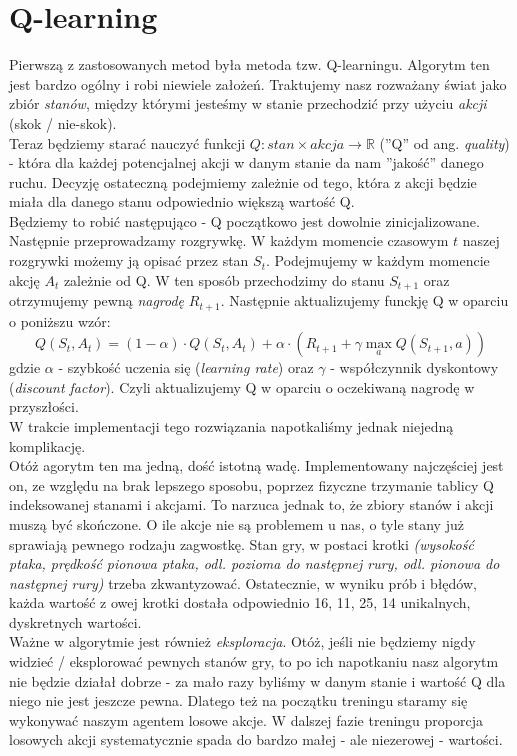\documentclass[12pt, A4]{article}
\begin{document}
\section{Q-learning}
Pierwszą z zastosowanych metod była metoda tzw. Q-learningu. Algorytm ten jest bardzo ogólny i robi niewiele założeń. Traktujemy nasz rozważany świat jako zbiór \textit{stanów}, między którymi jesteśmy w stanie przechodzić przy użyciu \textit{akcji} (skok / nie-skok).  \\
	Teraz będziemy starać nauczyć funkcji $Q: stan \times akcja \rightarrow \mathbb{R}$ (''Q'' od ang. \textit{quality}) - która dla każdej potencjalnej akcji w danym stanie da nam ''jakość'' danego ruchu. Decyzję ostateczną podejmiemy zależnie od tego, która z akcji będzie miała dla danego stanu odpowiednio większą wartość Q. \\	
	Będziemy to robić następująco - Q początkowo jest dowolnie zinicjalizowane. Następnie przeprowadzamy rozgrywkę. W każdym momencie czasowym $t$ naszej rozgrywki możemy ją opisać przez stan $S_t$. Podejmujemy w każdym momencie akcję $A_t$ zależnie od Q. W ten sposób przechodzimy do stanu $S_{t+1}$ oraz otrzymujemy pewną \textit{nagrodę} $R_{t+1}$. Następnie aktualizujemy funckję Q w oparciu o poniższu wzór:
	\[	Q(S_t, A_t) = (1-\alpha)\cdot Q(S_t, A_t) + \alpha \cdot \left( R_{t+1} + \gamma \max_a Q(S_{t+1}, a) \right)	\]
	gdzie $\alpha$ - szybkość uczenia się (\textit{learning rate}) oraz $\gamma$ - współczynnik dyskontowy (\textit{discount factor}).
	Czyli aktualizujemy Q w oparciu o oczekiwaną nagrodę w przyszłości. \\
	W trakcie implementacji tego rozwiązania napotkaliśmy jednak niejedną komplikację. \\

	Otóż agorytm ten ma jedną, dość istotną wadę. Implementowany najczęściej jest on, ze względu na brak lepszego sposobu, poprzez fizyczne trzymanie tablicy Q indeksowanej stanami i akcjami. To narzuca jednak to, że zbiory stanów i akcji muszą być skończone. O ile akcje nie są problemem u nas, o tyle stany już sprawiają pewnego rodzaju zagwostkę. Stan gry, w postaci krotki \textit{(wysokość ptaka, prędkość pionowa ptaka, odl. pozioma do następnej rury, odl. pionowa do następnej rury)} trzeba zkwantyzować. Ostatecznie, w wyniku prób i błędów, każda wartość z owej krotki dostała odpowiednio 16, 11, 25, 14 unikalnych, dyskretnych wartości. \\

	Ważne w algorytmie jest również \textit{eksploracja}. Otóż, jeśli nie będziemy nigdy widzieć / eksplorować pewnych stanów gry, to po ich napotkaniu nasz algorytm nie będzie działał dobrze - za mało razy byliśmy w danym stanie i wartość Q dla niego nie jest jeszcze pewna. Dlatego też na początku treningu staramy się wykonywać naszym agentem losowe akcje. W dalszej fazie treningu proporcja losowych akcji systematycznie spada do bardzo małej - ale niezerowej - wartości.    
\end{document}
